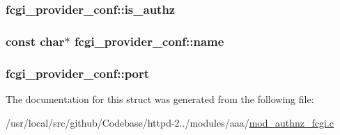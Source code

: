 \subsubsection[{\texorpdfstring{is\+\_\+authz}{is_authz}}]{ fcgi\+\_\+provider\+\_\+conf\+::is\+\_\+authz}\hypertarget{structfcgi__provider__conf_a03bfd192eda026a50c3673ce8d43a2c2}{}\label{structfcgi__provider__conf_a03bfd192eda026a50c3673ce8d43a2c2}
\subsubsection[{\texorpdfstring{name}{name}}]{\setlength{\rightskip}{0pt plus 5cm}const char$\ast$ fcgi\+\_\+provider\+\_\+conf\+::name}\hypertarget{structfcgi__provider__conf_af601d1fe91b391de481e9ac4e69a9b12}{}\label{structfcgi__provider__conf_af601d1fe91b391de481e9ac4e69a9b12}
\subsubsection[{\texorpdfstring{port}{port}}]{ fcgi\+\_\+provider\+\_\+conf\+::port}\hypertarget{structfcgi__provider__conf_a71d8f719744b0cff83bf0e08bd41c816}{}\label{structfcgi__provider__conf_a71d8f719744b0cff83bf0e08bd41c816}


The documentation for this struct was generated from the following file\+:\begin{DoxyCompactItemize}
\item 
/usr/local/src/github/\+Codebase/httpd-\/2../modules/aaa/\hyperlink{mod__authnz__fcgi_8c}{mod\+\_\+authnz\+\_\+fcgi.\+c}\end{DoxyCompactItemize}
